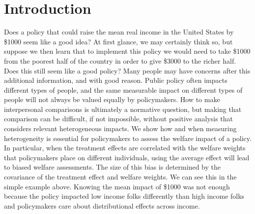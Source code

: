 \documentclass[12pt]{article}
\theoremstyle{definition}
\theoremstyle{definition}
\theoremstyle{definition}
\theoremstyle{definition}
\begin{document}
\onehalfspacing
\section{Introduction}

    Does a policy that could raise the mean real income in the United States by \$1000 seem like a good idea? At first glance, we may certainly think so, but suppose we then learn that to implement this policy we would need to take \$1000 from the poorest half of the country in order to give \$3000 to the richer half. Does this still seem like a good policy? Many people may have concerns after this additional information, and with good reason. Public policy often impacts different types of people, and the same measurable impact on different types of people will not always be valued equally by policymakers. How to make interpersonal comparisons is ultimately a normative question, but making that comparison can be difficult, if not impossible, without positive analysis that considers relevant heterogeneous impacts. We show how and when measuring heterogeneity is essential for policymakers to assess the  welfare impact of a policy. In particular, when the treatment effects are correlated with the welfare weights that policymakers place on different individuals, using the average effect will lead to biased welfare assessments. The size of this bias is determined by the covariance of the treatment effect and welfare weights. We can see this in the simple example above. Knowing the mean impact of \$1000 was not enough because the policy impacted low income folks differently than high income folks and policymakers care about distributional effects across income. 
\end{document}
